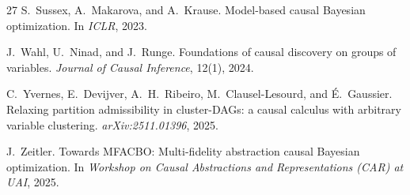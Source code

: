 \documentclass[twoside]{article}
\begin{document}
\begin{thebibliography}{27}
S.~Sussex, A.~Makarova, and A.~Krause.
\newblock Model-based causal {B}ayesian optimization.
\newblock In \emph{ICLR}, 2023.

J.~Wahl, U.~Ninad, and J.~Runge.
\newblock Foundations of causal discovery on groups of variables.
\newblock \emph{Journal of Causal Inference}, 12(1), 2024.

C.~Yvernes, E.~Devijver, A.~H.~Ribeiro, M.~Clausel-Lesourd, and \'E.~Gaussier.
\newblock Relaxing partition admissibility in cluster-{DAG}s: a causal calculus
with arbitrary variable clustering.
\newblock \emph{arXiv:2511.01396}, 2025.

J.~Zeitler.
\newblock Towards {MFACBO}: Multi-fidelity abstraction causal {B}ayesian
optimization.
\newblock In \emph{Workshop on Causal Abstractions and Representations (CAR) at UAI}, 2025.

\end{thebibliography}
\end{document}

